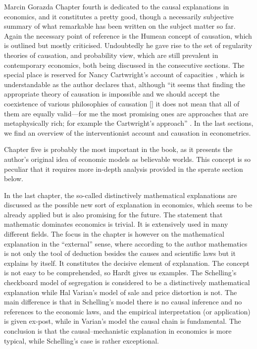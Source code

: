 \begin{recengenv}{Marcin Gorazda}
Chapter fourth is dedicated to the causal explanations in economics, and it constitutes a pretty good, though a
necessarily subjective summary of what remarkable has been written on the subject matter so far. Again the necessary
point of reference is the Humean concept of causation, which is outlined but mostly criticised. Undoubtedly he gave
rise to the set of regularity theories of causation, and probability view, which are still prevalent in contemporary
economics, both being discussed in the consecutive sections. The special place is reserved for Nancy Cartwright’s
account of capacities
\cite{cartwright_dappled_1999},
which is understandable as the author declares that,
although ``\mydots it seems that finding the appropriate theory of causation is impossible and we should accept the coexistence
of various philosophies of causation [\mydots] it does not mean that all of them are equally valid—for me the most
promising ones are approaches that are metaphysically rich; for example the Cartwright’s approach''
\parencite[p.118]{hardt_economics_2017}.
In the last sections, we find an overview of the interventionist account
and causation in econometrics. 

Chapter five is probably the most important in the book, as it presents the author’s original idea of economic models as
believable worlds. This concept is so peculiar that it requires more in-depth analysis provided in the sperate section
below.


In the last chapter, the so-called distinctively mathematical explanations are discussed as the possible new sort of
explanation in economics, which seems to be already applied but is also promising for the future. The statement that
mathematic dominates economics is trivial. It is extensively used in many different fields. The focus in the chapter is
however on the mathematical explanation in the ``external'' sense, where according to the author mathematics is not only
the tool of deduction besides the causes and scientific laws but it explains by itself. It constitutes the decisive
element of explanation. The concept is not easy to be comprehended, so Hardt gives us examples. The Schelling’s
checkboard model of segregation is considered to be a distinctively mathematical explanation while Hal Varian’s model
of sale and price distortion is not. The main difference is that in Schelling’s model there is no causal inference and
no references to the economic laws, and the empirical interpretation (or application) is given ex-post, while in
Varian’s model the causal chain is fundamental. The conclusion is that the causal–mechanistic explanation in economics
is more typical, while Schelling’s case is rather exceptional. 


\end{recengenv}
